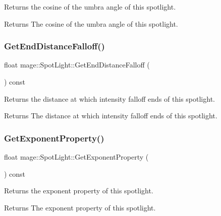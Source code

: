 Returns the cosine of the umbra angle of this spotlight.

\begin{DoxyReturn}{Returns}
The cosine of the umbra angle of this spotlight. 
\end{DoxyReturn}
\hypertarget{classmage_1_1_spot_light_a4d1d2c3a5f5b2a01e6e625d84eb588d1}{}\label{classmage_1_1_spot_light_a4d1d2c3a5f5b2a01e6e625d84eb588d1} 
\subsubsection{\texorpdfstring{Get\+End\+Distance\+Falloff()}{GetEndDistanceFalloff()}}
{\footnotesize\ttfamily float mage\+::\+Spot\+Light\+::\+Get\+End\+Distance\+Falloff (\begin{DoxyParamCaption}{ }\end{DoxyParamCaption}) const\hspace{0.3cm}{\ttfamily [noexcept]}}

Returns the distance at which intensity falloff ends of this spotlight.

\begin{DoxyReturn}{Returns}
The distance at which intensity falloff ends of this spotlight. 
\end{DoxyReturn}
\hypertarget{classmage_1_1_spot_light_a0e92cc6201e2b9c8b2eb06c50a53ae13}{}\label{classmage_1_1_spot_light_a0e92cc6201e2b9c8b2eb06c50a53ae13} 
\subsubsection{\texorpdfstring{Get\+Exponent\+Property()}{GetExponentProperty()}}
{\footnotesize\ttfamily float mage\+::\+Spot\+Light\+::\+Get\+Exponent\+Property (\begin{DoxyParamCaption}{ }\end{DoxyParamCaption}) const\hspace{0.3cm}{\ttfamily [noexcept]}}

Returns the exponent property of this spotlight.

\begin{DoxyReturn}{Returns}
The exponent property of this spotlight. 
\end{DoxyReturn}
\hypertarget{classmage_1_1_spot_light_a041dfc4fd7729d8d954f19af9debb3d1}{}\label{classmage_1_1_spot_light_a041dfc4fd7729d8d954f19af9debb3d1} 
